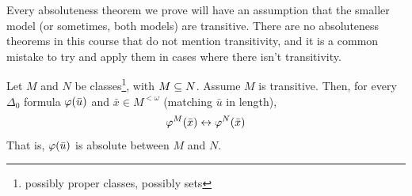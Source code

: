 Every absoluteness theorem we prove will have an assumption that the smaller model (or sometimes, both models) are transitive. There are no absoluteness theorems in this course that do not mention transitivity, and it is a common mistake to try and apply them in cases where there isn't transitivity.

\begin{boxlemma}
    Let $M$ and $N$ be classes\footnote{possibly proper classes, possibly sets}, with $M \subseteq N$. Assume $M$ is transitive. Then, for every $\Delta_0$ formula $\varphi\!\left( \bar{u} \right)$ and $\bar{x} \in M^{<\omega}$ (matching $\bar{u}$ in length),
    \begin{align*}
        \varphi^M\!\left( \bar{x} \right) \leftrightarrow \varphi^N\!\left( \bar{x} \right)
    \end{align*}
    That is, $\varphi\!\left( \bar{u} \right)$ is absolute between $M$ and $N$.
\end{boxlemma}
